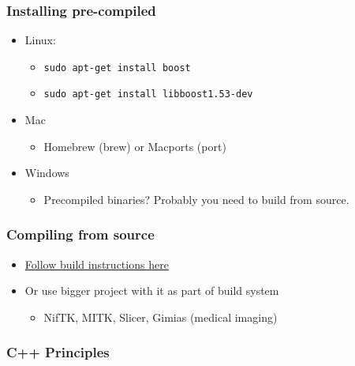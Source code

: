 \subsubsection{Installing pre-compiled}\label{installing-pre-compiled}

\begin{itemize}
\itemsep1pt\parskip0pt
\item
  Linux:

  \begin{itemize}
  \itemsep1pt\parskip0pt
  \item
    \texttt{sudo apt-get install boost}
  \item
    \texttt{sudo apt-get install libboost1.53-dev}
  \end{itemize}
\item
  Mac

  \begin{itemize}
  \itemsep1pt\parskip0pt
  \item
    Homebrew (brew) or Macports (port)
  \end{itemize}
\item
  Windows

  \begin{itemize}
  \itemsep1pt\parskip0pt
  \item
    Precompiled binaries? Probably you need to build from source.
  \end{itemize}
\end{itemize}

\subsubsection{Compiling from source}\label{compiling-from-source}

\begin{itemize}
\itemsep1pt\parskip0pt
\item
  \href{http://www.boost.org/doc/libs/1_57_0/libs/regex/doc/html/boost_regex/install.html}{Follow
  build instructions here}
\item
  Or use bigger project with it as part of build system

  \begin{itemize}
  \itemsep1pt\parskip0pt
  \item
    NifTK, MITK, Slicer, Gimias (medical imaging)
  \end{itemize}
\end{itemize}

\subsubsection{C++ Principles}\label{c-principles-1}


